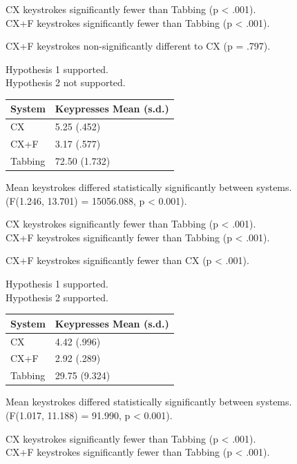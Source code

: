 \documentclass[a4paper, 12pt]{report}
\begin{document}
CX keystrokes significantly fewer than Tabbing (p < .001).\\
CX+F keystrokes significantly fewer than Tabbing (p < .001).

CX+F keystrokes non-significantly different to CX (p = .797).

Hypothesis 1 supported.\\
Hypothesis 2 not supported.

\begin{tabular}{l l}
\hline\hline %
System & Keypresses Mean (s.d.) \\ [0.5ex] %
\hline %
CX & 5.25 (.452)\\
CX+F & 3.17 (.577)\\
Tabbing & 72.50 (1.732)\\ [1ex] %
\hline %
\end{tabular}

Mean keystrokes differed statistically significantly between systems.\\
(F(1.246, 13.701) = 15056.088, p < 0.001).

CX keystrokes significantly fewer than Tabbing (p < .001).\\
CX+F keystrokes significantly fewer than Tabbing (p < .001).

CX+F keystrokes significantly fewer than CX (p < .001).

Hypothesis 1 supported.\\
Hypothesis 2 supported.

\begin{tabular}{l l}
\hline\hline %
System & Keypresses Mean (s.d.) \\ [0.5ex] %
\hline %
CX & 4.42 (.996)\\
CX+F & 2.92 (.289)\\
Tabbing & 29.75 (9.324)\\ [1ex] %
\hline %
\end{tabular}

Mean keystrokes differed statistically significantly between systems.\\
(F(1.017, 11.188) = 91.990, p < 0.001).

CX keystrokes significantly fewer than Tabbing (p < .001).\\
CX+F keystrokes significantly fewer than Tabbing (p < .001).
\end{document}
